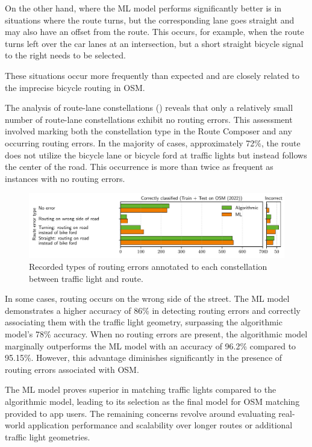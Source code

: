 On the other hand, where the ML model performs significantly better is in situations where the route turns, but the corresponding lane goes straight and may also have an offset from the route. This occurs, for example, when the route turns left over the car lanes at an intersection, but a short straight bicycle signal to the right needs to be selected.

These situations occur more frequently than expected and are closely related to the imprecise bicycle routing in OSM.

The analysis of route-lane constellations () reveals that only a relatively small number of route-lane constellations exhibit no routing errors. This assessment involved marking both the constellation type in the Route Composer and any occurring routing errors. In the majority of cases, approximately 72\%, the route does not utilize the bicycle lane or bicycle ford at traffic lights but instead follows the center of the road. This occurrence is more than twice as frequent as instances with no routing errors.

\begin{figure}[t]
\centering 
\includegraphics[width=\linewidth]{images/matching-route-errors-osm-old.pdf}
\caption{Recorded types of routing errors annotated to each constellation between traffic light and route.}
\label{fig:matching-routing-errors-osm}
\end{figure}

In some cases, routing occurs on the wrong side of the street. The ML model demonstrates a higher accuracy of 86\% in detecting routing errors and correctly associating them with the traffic light geometry, surpassing the algorithmic model's 78\% accuracy. When no routing errors are present, the algorithmic model marginally outperforms the ML model with an accuracy of 96.2\% compared to 95.15\%. However, this advantage diminishes significantly in the presence of routing errors associated with OSM.

The ML model proves superior in matching traffic lights compared to the algorithmic model, leading to its selection as the final model for OSM matching provided to app users. The remaining concerns revolve around evaluating real-world application performance and scalability over longer routes or additional traffic light geometries.

